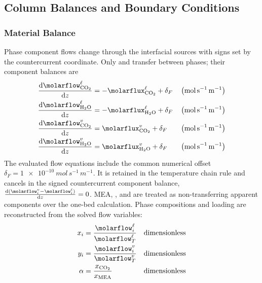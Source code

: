 \subsection{Column Balances and Boundary Conditions}\label{subsec:governing-equations}
\subsubsection{Material Balance}\label{subsubsec:material-balance}
Phase component flows change through the interfacial sources with signs set by the countercurrent coordinate.
Only \COtwo{} and \HtwoO{} transfer between phases; their component balances are
\begin{align}
\odv{\molarflow^{\liq}_{ \COtwo}}{z} &= -\molarflux^{\liq}_{ \COtwo} + \delta_F && \left(\unit{mol\,s^{-1}\,m^{-1}}\right)\\
\odv{\molarflow^{\liq}_{ \HtwoO}}{z} &= -\molarflux^{\liq}_{ \HtwoO} + \delta_F && \left(\unit{mol\,s^{-1}\,m^{-1}}\right)\\
\odv{\molarflow^{\vap}_{ \COtwo}}{z} &= \molarflux^{\vap}_{ \COtwo} + \delta_F && \left(\unit{mol\,s^{-1}\,m^{-1}}\right)\\
\odv{\molarflow^{\vap}_{ \HtwoO}}{z} &= \molarflux^{\vap}_{ \HtwoO} + \delta_F && \left(\unit{mol\,s^{-1}\,m^{-1}}\right)\label{eq:material-balance}
\end{align}
The evaluated flow equations include the common numerical offset \(\delta_F=\qty{1e-10}{mol\,s^{-1}\,m^{-1}}\).
It is retained in the temperature chain rule and cancels in the signed countercurrent component balance, \(\odv{(\molarflow_i^\vap-\molarflow_i^\liq)}{z}=0\).
MEA, \Ntwo, and \Otwo{} are treated as non-transferring apparent components over the one-bed calculation.
Phase compositions and loading are reconstructed from the solved flow variables:
\begin{align}
x_i &= \frac{\molarflow^{\liq}_{ i}}{\molarflow^{\liq}_{ T}}
&& \text{dimensionless}\\
y_i &= \frac{\molarflow^{\vap}_{ i}}{\molarflow^{\vap}_{ T}}
&& \text{dimensionless}\\
\alpha &= \frac{x_{\COtwo}}{x_{\MEA}}
&& \text{dimensionless}
\end{align}

